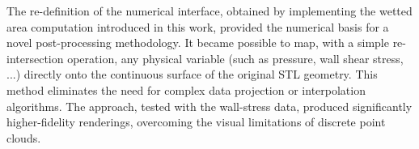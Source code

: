 \documentclass[12pt, a4paper, twoside, openright]{book}
\begin{document}
The re-definition of the numerical interface, obtained by implementing the wetted area computation introduced in this work, provided the numerical basis for a novel post-processing methodology. It became possible to map, with a simple re-intersection operation, any physical variable (such as pressure, wall shear stress, ...) directly onto the continuous surface of the original STL geometry. This method eliminates the need for complex data projection or interpolation algorithms. The approach, tested with the wall-stress data, produced significantly higher-fidelity renderings, overcoming the visual limitations of discrete point clouds.

\backmatter

\printbibliography[heading=bibintoc, title={Bibliography}]
\end{document}
